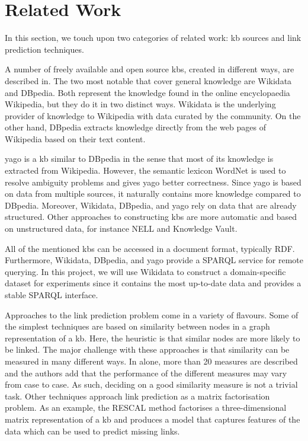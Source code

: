 \section{Related Work}\label{sec:related-work}

In this section, we touch upon two categories of related work: \ac{kb} sources and link prediction techniques.

A number of freely available and open source \acp{kb}, created in different ways, are described in\cite{Paulheim2016}.
The two most notable that cover general knowledge are Wikidata and DBpedia.
Both represent the knowledge found in the online encyclopaedia Wikipedia, but they do it in two distinct ways.
Wikidata is the underlying provider of knowledge to Wikipedia with data curated by the community\cite{Vrandecic2014}.
On the other hand, DBpedia extracts knowledge directly from the web pages of Wikipedia based on their text content\cite{Lehmann2015}.

\Ac{yago}\cite{Suchanek2007} is a \ac{kb} similar to DBpedia in the sense that most of its knowledge is extracted from Wikipedia.
However, the semantic lexicon WordNet is used to resolve ambiguity problems and gives \ac{yago} better correctness.
Since \ac{yago} is based on data from multiple sources, it naturally contains more knowledge compared to DBpedia.
Moreover, Wikidata, DBpedia, and \ac{yago} rely on data that are already structured.
Other approaches to constructing \acp{kb} are more automatic and based on unstructured data, for instance NELL\cite{Carlson2010} and Knowledge Vault\cite{Dong2014}.

All of the mentioned \acp{kb} can be accessed in a document format, typically RDF.\@
Furthermore, Wikidata, DBpedia, and \ac{yago} provide a SPARQL service for remote querying.
In this project, we will use Wikidata to construct a domain-specific dataset for experiments since it contains the most up-to-date data and provides a stable SPARQL interface.

Approaches to the link prediction problem come in a variety of flavours.
Some of the simplest techniques are based on similarity between nodes in a graph representation of a \ac{kb}\cite{Lue2011}.
Here, the heuristic is that similar nodes are more likely to be linked.
The major challenge with these approaches is that similarity can be measured in many different ways.
In\cite{Lue2011} alone, more than 20 measures are described and the authors add that the performance of the different measures may vary from case to case.
As such, deciding on a good similarity measure is not a trivial task.
Other techniques approach link prediction as a matrix factorisation problem.
As an example, the RESCAL\cite{Nickel2011} method factorises a three-dimensional matrix representation of a \ac{kb} and produces a model that captures features of the data which can be used to predict missing links.

